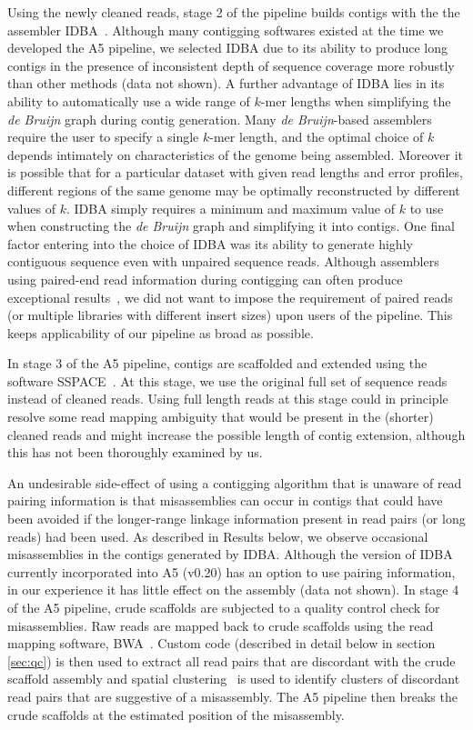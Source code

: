 \documentclass{bioinfo}
\begin{document}
\begin{methods}
Using the newly cleaned reads, stage 2 of the pipeline builds contigs
with the the assembler IDBA~\citep{Peng2010}. Although many contigging softwares existed at the time we developed the A5 pipeline, we selected IDBA due 
to its ability to produce long contigs in the presence of inconsistent depth of sequence coverage more robustly than other methods (data not shown).
A further advantage of IDBA lies in its ability to automatically use a wide range of $k$-mer lengths when simplifying the \emph{de Bruijn} graph 
during contig generation.
Many \emph{de Bruijn}-based assemblers require the user to specify a single $k$-mer length, and the optimal choice of $k$ depends intimately
on characteristics of the genome being assembled.  Moreover it is possible that for a particular dataset with given read lengths and error profiles, 
different regions of the same genome may be optimally reconstructed by different values of $k$. IDBA simply requires a minimum and maximum value of
$k$ to use when constructing the \emph{de Bruijn} graph and simplifying it into contigs. One final factor entering into the choice of IDBA was its 
ability to generate highly contiguous sequence even with unpaired sequence reads. Although assemblers using paired-end read information during 
contigging can often produce exceptional results~\citep{Gnerre2011, SASSY}, we did not want to impose the requirement of paired reads (or multiple
libraries with different insert sizes) upon users of the pipeline. This keeps applicability of our pipeline as broad as possible.

In stage 3 of the A5 pipeline, contigs are scaffolded and extended using the software SSPACE~\citep{Boetzer2011}. At this stage, we use the original
full set of sequence reads instead of cleaned reads. Using full length reads at this stage could in principle resolve some read mapping ambiguity 
that would be present in the (shorter) cleaned reads and might increase the possible length of contig extension, although this has not been thoroughly
examined by us.

An undesirable side-effect of using a contigging algorithm that is unaware of read pairing information is that misassemblies can occur in contigs 
that could have been avoided if the longer-range linkage information present in read pairs (or long reads) had been used.  As described in Results 
below, we observe occasional misassemblies in the contigs generated by IDBA. Although the version of IDBA currently incorporated into A5 (v0.20) has
an option to use pairing information, in our experience it has little effect on the assembly (data not shown). In stage 4 of the A5 pipeline, crude 
scaffolds are subjected to a quality control check for misassemblies. Raw reads are mapped back to crude scaffolds using the read mapping software,
BWA~\citep{bwa}. Custom code (described in detail below in section \ref{sec:qc}) is then used to extract all read pairs that are discordant with the 
crude scaffold assembly and spatial clustering~\citep{DBSCAN} is used to identify clusters of discordant read pairs that are suggestive of a 
misassembly. The A5 pipeline then breaks the crude scaffolds at the estimated position of the misassembly.


\end{methods}
\end{document}
